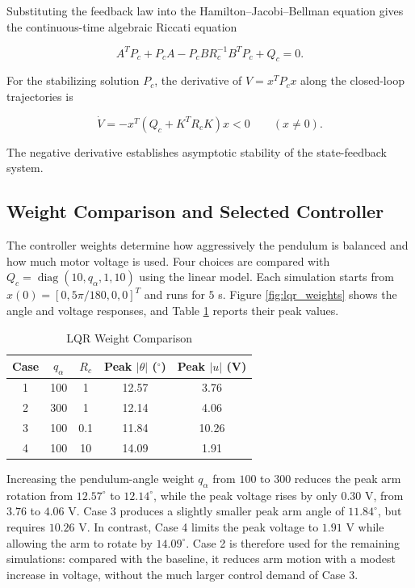 \documentclass[conference]{IEEEtran}
\newcommand{\diag}{\operatorname{diag}}
\begin{document}
Substituting the feedback law into the Hamilton--Jacobi--Bellman equation gives the continuous-time algebraic Riccati equation

\begin{equation}
A^TP_c+P_cA-P_cBR_c^{-1}B^TP_c+Q_c=0.
\label{eq:controlcare}
\end{equation}

For the stabilizing solution $P_c$, the derivative of $V=x^TP_cx$ along the closed-loop trajectories is

\begin{equation}
\dot V=-x^T(Q_c+K^TR_cK)x<0\qquad(x\ne0).
\label{eq:lyapunov}
\end{equation}

The negative derivative establishes asymptotic stability of the state-feedback system.

\subsection{Weight Comparison and Selected Controller}

The controller weights determine how aggressively the pendulum is balanced and how much motor voltage is used. Four choices are compared with $Q_c=\diag(10,q_\alpha,1,10)$ using the linear model. Each simulation starts from $x(0)=[0,5\pi/180,0,0]^T$ and runs for $5$ s. Figure \ref{fig:lqr_weights} shows the angle and voltage responses, and Table \ref{tab:lqr} reports their peak values.

\begin{table}[t]
\caption{LQR Weight Comparison}
\label{tab:lqr}
\centering\small
\begin{tabular}{@{}ccccc@{}}
\toprule
Case & $q_\alpha$ & $R_c$ & Peak $|\theta|$ ($^\circ$) & Peak $|u|$ (V)\\
\midrule
1 & 100 & 1 & 12.57 & 3.76\\
2 & 300 & 1 & 12.14 & 4.06\\
3 & 100 & 0.1 & 11.84 & 10.26\\
4 & 100 & 10 & 14.09 & 1.91\\
\bottomrule
\end{tabular}
\end{table}

Increasing the pendulum-angle weight $q_\alpha$ from $100$ to $300$ reduces the peak arm rotation from $12.57^\circ$ to $12.14^\circ$, while the peak voltage rises by only $0.30$ V, from $3.76$ to $4.06$ V. Case 3 produces a slightly smaller peak arm angle of $11.84^\circ$, but requires $10.26$ V. In contrast, Case 4 limits the peak voltage to $1.91$ V while allowing the arm to rotate by $14.09^\circ$. Case 2 is therefore used for the remaining simulations: compared with the baseline, it reduces arm motion with a modest increase in voltage, without the much larger control demand of Case 3.
\end{document}
